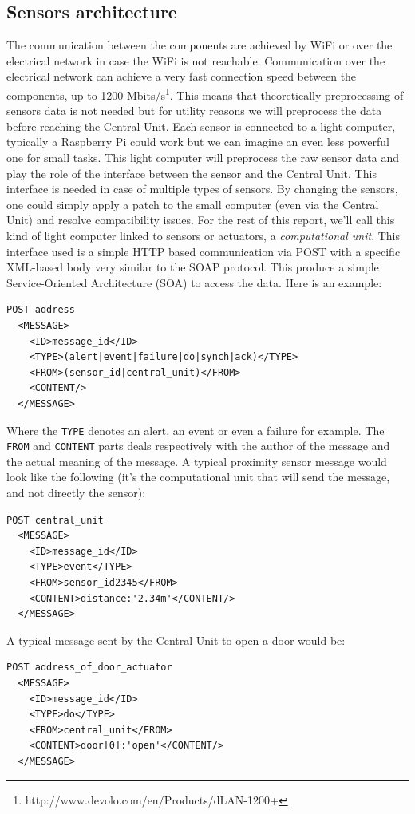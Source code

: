\documentclass{acm_proc_article-sp}
\begin{document}
\subsection{Sensors architecture}
The communication between the components are achieved by WiFi or over the electrical network in case the WiFi is not reachable. 
Communication over the electrical network can achieve a very fast connection speed between the components, up to 1200 Mbits/s\footnote{http://www.devolo.com/en/Products/dLAN-1200+}. 
This means that theoretically preprocessing of sensors data is not needed but for utility reasons we will preprocess the data before reaching the Central Unit.
Each sensor is connected to a light computer, typically a Raspberry Pi could work but we can imagine an even less powerful one for small tasks. 
This light computer will preprocess the raw sensor data and play the role of the interface between the sensor and the Central Unit. 
This interface is needed in case of multiple types of sensors. By changing the sensors, one could simply apply a patch to the small computer (even via the Central Unit) and resolve compatibility issues. For the rest of this report, we'll call this kind of light computer linked to sensors or actuators, a \textit{computational unit}.
This interface used is a simple HTTP based communication via POST with a specific XML-based body very similar to the SOAP protocol. 
This produce a simple Service-Oriented Architecture (SOA) to access the data. 
Here is an example:
\begin{verbatim}
POST address 
  <MESSAGE>
    <ID>message_id</ID>
    <TYPE>(alert|event|failure|do|synch|ack)</TYPE>
    <FROM>(sensor_id|central_unit)</FROM>
    <CONTENT/>
  </MESSAGE>
\end{verbatim}
Where the \texttt{TYPE} denotes an alert, an event or even a failure for example. 
The \texttt{FROM} and \texttt{CONTENT} parts deals respectively with the author of the message and the actual meaning of the message. 
A typical proximity sensor message would look like the following (it's the computational unit that will send the message, and not directly the sensor):
\begin{verbatim}
POST central_unit 
  <MESSAGE>
    <ID>message_id</ID>
    <TYPE>event</TYPE>
    <FROM>sensor_id2345</FROM>
    <CONTENT>distance:'2.34m'</CONTENT/>
  </MESSAGE>
\end{verbatim}
A typical message sent by the Central Unit to open a door would be:
\begin{verbatim}
POST address_of_door_actuator
  <MESSAGE>
    <ID>message_id</ID>
    <TYPE>do</TYPE>
    <FROM>central_unit</FROM>
    <CONTENT>door[0]:'open'</CONTENT/>
  </MESSAGE> 
\end{verbatim}
\end{document}
